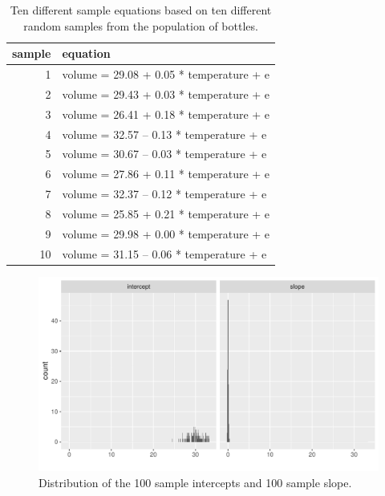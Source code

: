 \documentclass[]{book}\usepackage[]{graphicx}\usepackage[]{color}
\makeatletter
\def\maxwidth{ %
  \ifdim\Gin@nat@width>\linewidth
    \linewidth
  \else
    \Gin@nat@width
  \fi
}
\newenvironment{knitrout}{}{} %
\makeatother
\begin{document}
\begin{table}[ht]
\centering
\caption{Ten different sample equations based on ten different random samples from the population of bottles.} 
\label{tab:inf_3a}
\begin{tabular}{rl}
  \hline
sample & equation \\ 
  \hline
1 & volume =  29.08  +  0.05 * temperature + e \\ 
  2 & volume =  29.43  +  0.03 * temperature + e \\ 
  3 & volume =  26.41  +  0.18 * temperature + e \\ 
  4 & volume =  32.57  --  0.13 * temperature + e \\ 
  5 & volume =  30.67  --  0.03 * temperature + e \\ 
  6 & volume =  27.86  +  0.11 * temperature + e \\ 
  7 & volume =  32.37  --  0.12 * temperature + e \\ 
  8 & volume =  25.85  +  0.21 * temperature + e \\ 
  9 & volume =  29.98  +  0.00 * temperature + e \\ 
  10 & volume =  31.15  --  0.06 * temperature + e \\ 
   \hline
\end{tabular}
\end{table}






\begin{knitrout}
\color{fgcolor}\begin{figure}

{\centering \includegraphics[width=\maxwidth]{figure/inf_3b-1} 

}

\caption[Distribution of the 100 sample intercepts and 100 sample slope]{Distribution of the 100 sample intercepts and 100 sample slope.}\label{fig:inf_3b}
\end{figure}


\end{knitrout}
\end{document}
